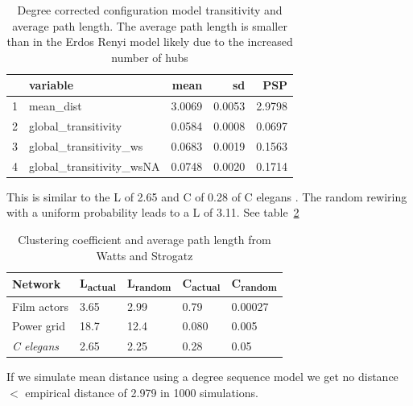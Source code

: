 \begin{table}[ht]
\centering
\begin{tabular}{rlrrr}
  \hline
 & variable & mean & sd & PSP \\ 
  \hline
1 & mean\_dist & 3.0069 & 0.0053 & 2.9798 \\ 
  2 & global\_transitivity & 0.0584 & 0.0008 & 0.0697 \\ 
  3 & global\_transitivity\_ws & 0.0683 & 0.0019 & 0.1563 \\ 
  4 & global\_transitivity\_wsNA & 0.0748 & 0.0020 & 0.1714 \\ 
   \hline
\end{tabular}
\caption{Degree corrected configuration model transitivity and average path length. The average path length is smaller than in the Erdos Renyi model likely due to the increased number of hubs}
\label{tab:cmtransitivity_configuration_model}
\end{table}
This is similar to the L of 2.65 and C of 0.28 of C elegans . The random rewiring with a uniform probability leads to a L of 3.11.  See table~\ref{tab:clustering and path length Watts and Strogatz}


\begin{table}[h]
    \centering
    \begin{tabular}{lllll}
    Network      & L\textsubscript{actual} & L\textsubscript{random} & C\textsubscript{actual} & C\textsubscript{random} \\
    \hline
     Film actors    & 3.65 & 2.99 & 0.79 & 0.00027\\
     Power grid & 18.7 & 12.4 & 0.080 & 0.005 \\
     \textit{C elegans} & 2.65 & 2.25 & 0.28 & 0.05 \\
    \end{tabular}
    \caption{Clustering coefficient and average path length from Watts and Strogatz}
    \label{tab:clustering and path length Watts and Strogatz}
\end{table}


If we simulate mean distance using a degree sequence model we get no distance $<$ empirical distance of 2.979 in 1000 simulations.
